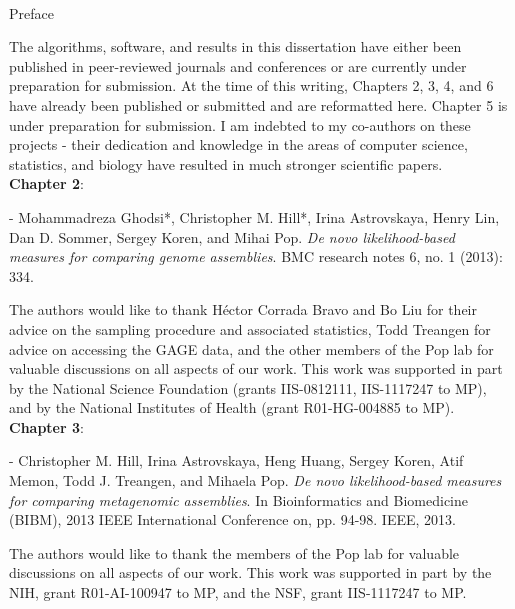 
\renewcommand{\baselinestretch}{2}
\small\normalsize
\hbox{\ }

\vspace{-.65in}

\begin{center}
\large{Preface}
\end{center}


The algorithms, software, and results in this dissertation have either been published in peer-reviewed journals and conferences or are currently under preparation for submission.
At the time of this writing, Chapters 2, 3, 4, and 6 have already been published or submitted and are reformatted here. Chapter 5 is under preparation for submission.
I am indebted to my co-authors on these projects - their dedication and knowledge in the areas of computer science, statistics, and biology have resulted in much stronger scientific papers. \\

\noindent\textbf{Chapter 2}:

\noindent - Mohammadreza Ghodsi*, Christopher M. Hill*, Irina Astrovskaya, Henry Lin, Dan D. Sommer, Sergey Koren, and Mihai  Pop. \textit{De novo likelihood-based measures for comparing genome assemblies}. BMC research notes 6, no. 1 (2013): 334.

The authors would like to thank H\'{e}ctor Corrada Bravo and Bo Liu for their advice on the sampling procedure and associated statistics, Todd Treangen for advice on accessing the GAGE data, and the other members of the Pop lab for valuable discussions on all aspects of our work. This work was supported in part by the National Science Foundation
(grants IIS-0812111, IIS-1117247 to MP), and by the National
Institutes of Health (grant R01-HG-004885 to MP).\\

\noindent\textbf{Chapter 3}:

\noindent - Christopher M. Hill, Irina Astrovskaya, Heng Huang, Sergey Koren, Atif Memon, Todd J. Treangen, and Mihaela Pop. \textit{De novo likelihood-based measures for comparing metagenomic assemblies}. In Bioinformatics and Biomedicine (BIBM), 2013 IEEE International Conference on, pp. 94-98. IEEE, 2013.

The authors would like to thank the members of the Pop lab for valuable discussions on all aspects of our work. This work was supported in part by the NIH, grant R01-AI-100947 to MP, and the NSF, grant IIS-1117247 to MP. \\

